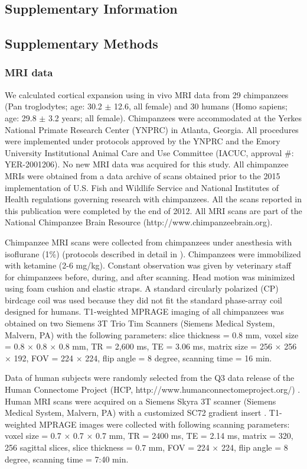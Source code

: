 \begin{refsection}
\newpage
\section*{Supplementary Information}
\subsection*{Supplementary Methods}
\subsubsection*{MRI data}
We calculated cortical expansion using in vivo MRI data from 29 chimpanzees (Pan troglodytes; age: 30.2 $\pm$ 12.6, all female) and 30 humans (Homo sapiens; age: 29.8 $\pm$ 3.2 years; all female). Chimpanzees were accommodated at the Yerkes National Primate Research Center (YNPRC) in Atlanta, Georgia. All procedures were implemented under protocols approved by the YNPRC and the Emory University Institutional Animal Care and Use Committee (IACUC, approval \#: YER-2001206). No new MRI data was acquired for this study. All chimpanzee MRIs were obtained from a data archive of scans obtained prior to the 2015 implementation of U.S. Fish and Wildlife Service and National Institutes of Health regulations governing research with chimpanzees. All the scans reported in this publication were completed by the end of 2012. All MRI scans are part of the National Chimpanzee Brain Resource (http://www.chimpanzeebrain.org).

Chimpanzee MRI scans were collected from chimpanzees under anesthesia with isoflurane (1\%) (protocols described in detail in \citep{Li2013MappingPH}). Chimpanzees were immobilized with ketamine (2-6 mg/kg). Constant observation was given by veterinary staff for chimpanzees before, during, and after scanning. Head motion was minimized using foam cushion and elastic straps. A standard circularly polarized (CP) birdcage coil was used because they did not fit the standard phase-array coil designed for humans. T1-weighted MPRAGE imaging of all chimpanzees was obtained on two Siemens 3T Trio Tim Scanners (Siemens Medical System, Malvern, PA) with the following parameters: slice thickness = 0.8 mm, voxel size = 0.8 $\times$ 0.8 $\times$ 0.8 mm, TR = 2,600 ms, TE = 3.06 ms, matrix size = 256 $\times$ 256 $\times$ 192, FOV = 224 $\times$ 224, flip angle = 8 degree, scanning time = 16 min.

Data of human subjects were randomly selected from the Q3 data release of the Human Connectome Project (HCP, http://www.humanconnectomeproject.org/) \citep{VANESSEN201362}. Human MRI scans were acquired on a Siemens Skyra 3T scanner (Siemens Medical System, Malvern, PA) with a customized SC72 gradient insert \citep{VANESSEN201362}. T1-weighted MPRAGE images were collected with following scanning parameters: voxel size = 0.7 $\times$ 0.7 $\times$ 0.7 mm, TR = 2400 ms, TE = 2.14 ms, matrix = 320, 256 sagittal slices, slice thickness = 0.7 mm, FOV = 224 $\times$ 224, flip angle = 8 degree, scanning time = 7:40 min.


\end{refsection}
